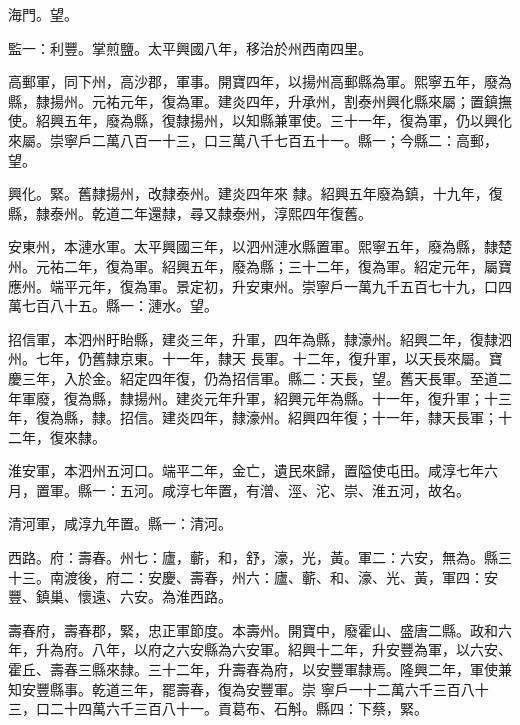 \begin{pinyinscope}
 海門。望。



 監一：利豐。掌煎鹽。太平興國八年，移治於州西南四里。



 高郵軍，同下州，高沙郡，軍事。開寶四年，以揚州高郵縣為軍。熙寧五年，廢為縣，隸揚州。元祐元年，復為軍。建炎四年，升承州，割泰州興化縣來屬；置鎮撫使。紹興五年，廢為縣，復隸揚州，以知縣兼軍使。三十一年，復為軍，仍以興化來屬。崇寧戶二萬八百一十三，口三萬八千七百五十一。縣一；今縣二：高郵，望。



 興化。緊。舊隸揚州，改隸泰州。建炎四年來
 隸。紹興五年廢為鎮，十九年，復縣，隸泰州。乾道二年還隸，尋又隸泰州，淳熙四年復舊。



 安東州，本漣水軍。太平興國三年，以泗州漣水縣置軍。熙寧五年，廢為縣，隸楚州。元祐二年，復為軍。紹興五年，廢為縣；三十二年，復為軍。紹定元年，屬寶應州。端平元年，復為軍。景定初，升安東州。崇寧戶一萬九千五百七十九，口四萬七百八十五。縣一：漣水。望。



 招信軍，本泗州盱眙縣，建炎三年，升軍，四年為縣，隸濠州。紹興二年，復隸泗州。七年，仍舊隸京東。十一年，隸天
 長軍。十二年，復升軍，以天長來屬。寶慶三年，入於金。紹定四年復，仍為招信軍。縣二：天長，望。舊天長軍。至道二年軍廢，復為縣，隸揚州。建炎元年升軍，紹興元年為縣。十一年，復升軍；十三年，復為縣，隸。招信。建炎四年，隸濠州。紹興四年復；十一年，隸天長軍；十二年，復來隸。



 淮安軍，本泗州五河口。端平二年，金亡，遺民來歸，置隘使屯田。咸淳七年六月，置軍。縣一：五河。咸淳七年置，有潧、涇、沱、崇、淮五河，故名。



 清河軍，咸淳九年置。縣一：清河。



 西路。府：壽春。州七：廬，蘄，和，舒，濠，光，黃。軍二：六安，無為。縣三十三。南渡後，府二：安慶、壽春，州六：廬、蘄、和、濠、光、黃，軍四：安豐、鎮巢、懷遠、六安。為淮西路。



 壽春府，壽春郡，緊，忠正軍節度。本壽州。開寶中，廢霍山、盛唐二縣。政和六年，升為府。八年，以府之六安縣為六安軍。紹興十二年，升安豐為軍，以六安、霍丘、壽春三縣來隸。三十二年，升壽春為府，以安豐軍隸焉。隆興二年，軍使兼知安豐縣事。乾道三年，罷壽春，復為安豐軍。崇
 寧戶一十二萬六千三百八十三，口二十四萬六千三百八十一。貢葛布、石斛。縣四：下蔡，緊。




\end{pinyinscope}
